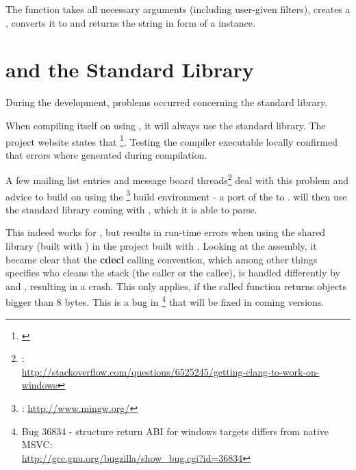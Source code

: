 The function  takes all necessary arguments (including user-given filters), creates a , converts it to  and returns the  string in form of a  instance.

\section{ and the  Standard Library}

During the development, problems occurred concerning the  standard library.

When compiling  itself on  using , it will always use the  standard library. The  project website states that \footnote{\citep{LLVMHPVS}}. Testing the  compiler executable locally confirmed that errors where generated during compilation.

A few mailing list entries and message board threads\footnote{:\\ \url{http://stackoverflow.com/questions/6525245/getting-clang-to-work-on-windows}} deal with this problem and advice to build  on  using the \footnote{: \url{http://www.mingw.org/}} build environment - a port of the  to .  will then use the standard library coming with , which it is able to parse.

This indeed works for , but results in run-time errors when using the  shared library (built with ) in the  project built with . Looking at the assembly, it became clear that the \textbf{cdecl} calling convention, which among other things specifies who cleans the stack (the caller or the callee), is handled differently by  and , resulting in a crash. This only applies, if the called function returns objects bigger than 8 bytes. This is a bug in \footnote{Bug 36834 - structure return ABI for windows targets differs from native MSVC:\\ \url{http://gcc.gnu.org/bugzilla/show_bug.cgi?id=36834}} that will be fixed in coming versions.

